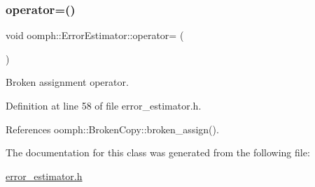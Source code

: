 \mbox{\label{classoomph_1_1ErrorEstimator_abebe636e6ad890ee2cea23366f9ac719}} 
\subsubsection{\texorpdfstring{operator=()}{operator=()}}
{\footnotesize\ttfamily void oomph\+::\+Error\+Estimator\+::operator= (\begin{DoxyParamCaption}\item[{const \hyperlink{classoomph_1_1ErrorEstimator}{Error\+Estimator} \&}]{ }\end{DoxyParamCaption})\hspace{0.3cm}{\ttfamily [inline]}}



Broken assignment operator. 



Definition at line 58 of file error\+\_\+estimator.\+h.



References oomph\+::\+Broken\+Copy\+::broken\+\_\+assign().



The documentation for this class was generated from the following file\+:\begin{DoxyCompactItemize}
\item 
\hyperlink{error__estimator_8h}{error\+\_\+estimator.\+h}\end{DoxyCompactItemize}

